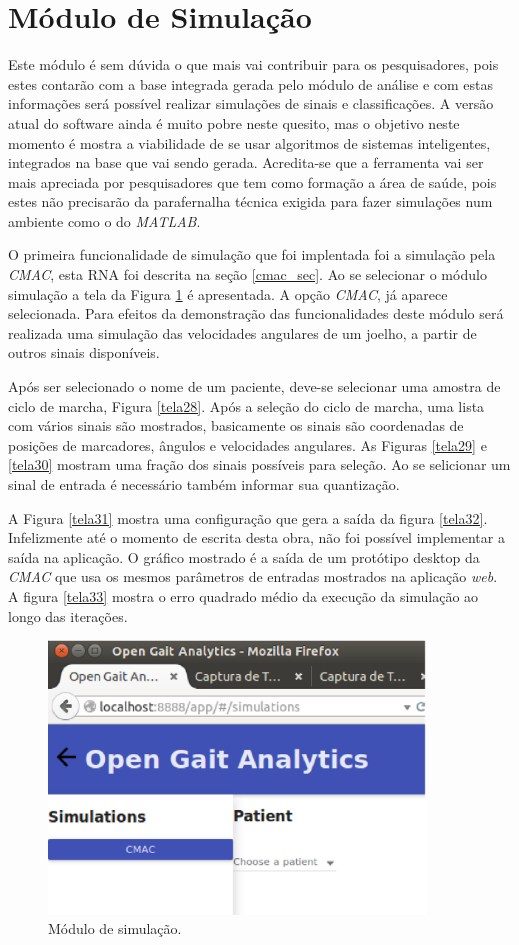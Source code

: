 \goodbreak
\newpage
\clearpage
\section{Módulo de Simulação}
Este módulo é sem dúvida o que mais vai contribuir para os pesquisadores, pois estes contarão com a base integrada gerada pelo módulo de análise e com estas informações será possível realizar simulações de sinais e classificações. 
A versão atual do software ainda é muito pobre neste quesito, mas o objetivo neste momento é mostra a viabilidade de se usar algoritmos de sistemas inteligentes, integrados na base que vai sendo gerada.
Acredita-se que a ferramenta vai ser mais apreciada por pesquisadores que tem como formação a área de saúde, pois estes não precisarão da parafernalha técnica exigida para fazer simulações num ambiente como o do \emph{MATLAB}.

O primeira funcionalidade de simulação que foi implentada foi a simulação pela \emph{CMAC}, esta RNA foi descrita na seção \ref{cmac_sec}. 
Ao se selecionar o módulo simulação a tela da Figura \ref{tela27} é apresentada. 
A opção \emph{CMAC}, já aparece selecionada. 
Para efeitos da demonstração das funcionalidades deste módulo será realizada uma simulação das velocidades angulares de um joelho, a partir de outros sinais disponíveis.

Após ser selecionado o nome de um paciente, deve-se selecionar uma amostra de ciclo de marcha, Figura \ref{tela28}.
Após a seleção do ciclo de marcha, uma lista com vários sinais são mostrados, basicamente os sinais são coordenadas de posições de marcadores, ângulos e velocidades angulares. As Figuras \ref{tela29} e \ref{tela30} mostram uma fração dos sinais possíveis para seleção. Ao se selicionar um sinal de entrada é necessário também informar sua quantização.

A Figura \ref{tela31} mostra uma configuração que gera a saída da figura \ref{tela32}. Infelizmente até o momento de escrita desta obra, não foi possível implementar a saída na aplicação. O gráfico mostrado é a saída de um protótipo desktop da \emph{CMAC} que usa os mesmos parâmetros de entradas mostrados na aplicação \emph{web}.
A figura \ref{tela33} mostra o erro quadrado médio da execução da simulação ao longo das iterações.

\begin{figure}[ht]
	\centering
	\includegraphics[width=10cm]{figuras/tela27.eps}
	\caption{Módulo de simulação.}
\label{tela27}
\end{figure}


